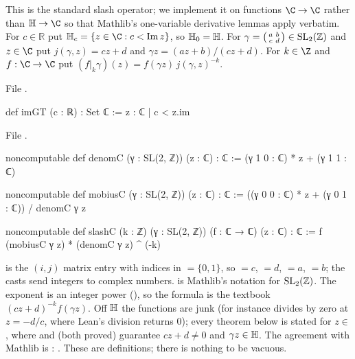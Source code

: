 \begin{definition}\label{l14:def:slashC}
This is the standard slash operator; we implement it on functions $\C\to\C$ rather than $\lfourteenH\to\C$ so that Mathlib's
one-variable derivative lemmas apply verbatim. For $c\in\mathbb R$ put $\lfourteenH_c = \{z\in\C : c<\lfourteenIm z\}$, so
$\mathbb{H}_0 = \mathbb{H}$. For
$\gamma = \left(\begin{smallmatrix}a&b\\c&d\end{smallmatrix}\right)\in\mathrm{SL}_2(\mathbb{Z})$ and $z\in\C$ put
$j(\gamma,z) = cz+d$ and $\gamma z = (az+b)/(cz+d)$. For $k\in\Z$ and $f:\C\to\C$ put
$(f|_k\gamma)(z) = f(\gamma z)\,j(\gamma,z)^{-k}$.
\end{definition}
\noindent File .
\begin{leancode}
def imGT (c : ℝ) : Set ℂ := {z : ℂ | c < z.im}
\end{leancode}
\noindent File .
\begin{leancode}
noncomputable def denomC (γ : SL(2, ℤ)) (z : ℂ) : ℂ := (γ 1 0 : ℂ) * z + (γ 1 1 : ℂ)

noncomputable def mobiusC (γ : SL(2, ℤ)) (z : ℂ) : ℂ :=
  ((γ 0 0 : ℂ) * z + (γ 0 1 : ℂ)) / denomC γ z

noncomputable def slashC (k : ℤ) (γ : SL(2, ℤ)) (f : ℂ → ℂ) (z : ℂ) : ℂ :=
  f (mobiusC γ z) * (denomC γ z) ^ (-k)
\end{leancode}
\begin{dictionary}
 is the $(i,j)$ matrix entry with indices in  $=\{0,1\}$, so  $=c$,  $=d$,
 $=a$,  $=b$; the casts  send integers to complex numbers.  is
Mathlib's notation for $\mathrm{SL}_2(\mathbb{Z})$. The exponent  is an integer power (), so the formula is the
textbook $(cz+d)^{-k}f(\gamma z)$. Off $\mathbb{H}$ the functions are junk (for instance  divides by zero at
$z=-d/c$, where Lean's division returns $0$); every theorem below is stated for $z\in$ , where
 and  (both proved) guarantee $cz+d\neq0$ and $\gamma z\in\mathbb{H}$. The
agreement with Mathlib is : . These are
definitions; there is nothing to be vacuous.
\end{dictionary}
